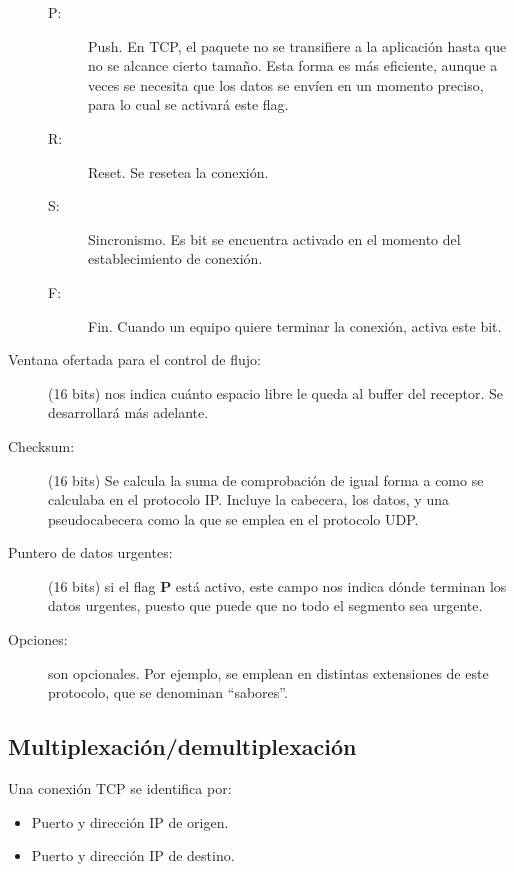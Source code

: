 \begin{description}
\begin{description}
            \item [P:] Push. En \acrshort{TCP}, el paquete no se transifiere a la aplicación hasta que no se alcance cierto tamaño. Esta forma es más eficiente, aunque a veces se necesita que los datos se envíen en un momento preciso, para lo cual se activará este flag.
            \item [R:] Reset. Se resetea la conexión.
            \item [S:] Sincronismo. Es bit se encuentra activado en el momento del establecimiento de conexión.
            \item [F:] Fin. Cuando un equipo quiere terminar la conexión, activa este bit.
        \end{description}
    \item [Ventana ofertada para el control de flujo:] (16 bits) nos indica cuánto espacio libre le queda al buffer del receptor. Se desarrollará más adelante. 
    \item [Checksum:] (16 bits) Se calcula la suma de comprobación de igual forma a como se calculaba en el protocolo \acrshort{IP}. Incluye la cabecera, los datos, y una pseudocabecera como la que se emplea en el protocolo \acrshort{UDP}.
    \item [Puntero de datos urgentes:] (16 bits) si el flag \textbf{P} está activo, este campo nos indica dónde terminan los datos urgentes, puesto que puede que no todo el segmento sea urgente.
    \item [Opciones:] son opcionales. Por ejemplo, se emplean en distintas extensiones de este protocolo, que se denominan ``sabores''.
\end{description}

\subsection{Multiplexación/demultiplexación}

Una conexión \acrshort{TCP} se identifica por:
\begin{itemize}
    \item Puerto y dirección \acrshort{IP} de origen.
    \item Puerto y dirección \acrshort{IP} de destino.
\end{itemize}

